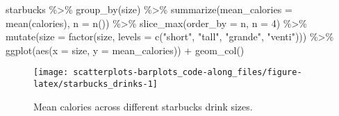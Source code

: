 \documentclass[
]{article}
\newenvironment{Shaded}{\begin{snugshade}}{\end{snugshade}}
\newcommand{\AttributeTok}[1]{\textcolor[rgb]{0.77,0.63,0.00}{#1}}
\newcommand{\DecValTok}[1]{\textcolor[rgb]{0.00,0.00,0.81}{#1}}
\newcommand{\FunctionTok}[1]{\textcolor[rgb]{0.00,0.00,0.00}{#1}}
\newcommand{\NormalTok}[1]{#1}
\newcommand{\SpecialCharTok}[1]{\textcolor[rgb]{0.00,0.00,0.00}{#1}}
\newcommand{\StringTok}[1]{\textcolor[rgb]{0.31,0.60,0.02}{#1}}
\begin{document}
\begin{Shaded}
\begin{Highlighting}[]
\NormalTok{starbucks }\SpecialCharTok{\%\textgreater{}\%}
  \FunctionTok{group\_by}\NormalTok{(size) }\SpecialCharTok{\%\textgreater{}\%}
  \FunctionTok{summarize}\NormalTok{(}\AttributeTok{mean\_calories =} \FunctionTok{mean}\NormalTok{(calories),}
            \AttributeTok{n =} \FunctionTok{n}\NormalTok{()) }\SpecialCharTok{\%\textgreater{}\%}
  \FunctionTok{slice\_max}\NormalTok{(}\AttributeTok{order\_by =}\NormalTok{ n, }\AttributeTok{n =} \DecValTok{4}\NormalTok{) }\SpecialCharTok{\%\textgreater{}\%}
  \FunctionTok{mutate}\NormalTok{(}\AttributeTok{size =} \FunctionTok{factor}\NormalTok{(size,}
                       \AttributeTok{levels =} \FunctionTok{c}\NormalTok{(}\StringTok{"short"}\NormalTok{,}
                                  \StringTok{"tall"}\NormalTok{,}
                                  \StringTok{"grande"}\NormalTok{,}
                                  \StringTok{"venti"}\NormalTok{))) }\SpecialCharTok{\%\textgreater{}\%}
  \FunctionTok{ggplot}\NormalTok{(}\FunctionTok{aes}\NormalTok{(}\AttributeTok{x =}\NormalTok{ size,}
             \AttributeTok{y =}\NormalTok{ mean\_calories)) }\SpecialCharTok{+}
  \FunctionTok{geom\_col}\NormalTok{()}
\end{Highlighting}
\end{Shaded}

\begin{figure}

{\centering \texttt{[image: scatterplots-barplots\_code-along\_files/figure-latex/starbucks\_drinks-1]} 

}

\caption{Mean calories across different starbucks drink sizes.}\label{fig:starbucks_drinks}
\end{figure}
\end{document}
